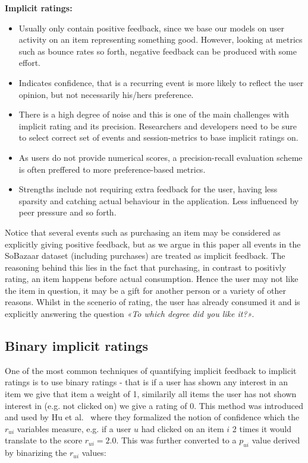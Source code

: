 \textbf{Implicit ratings:}
\begin{itemize}
\item Usually only contain positive feedback, since we base our models on user
activity on an item representing something good. However, looking at metrics
such as bounce rates so forth, negative feedback can be produced with some
effort.
\item Indicates confidence, that is a recurring event is more likely to reflect
the user opinion, but not necessarily his/hers preference.
\item There is a high degree of noise and this is one of the main challenges
with implicit rating and its precision. Researchers and developers need to be
sure to select correct set of events and session-metrics to base implicit
ratings on.
\item As users do not provide numerical scores, a precision-recall evaluation
scheme is often preffered to more preference-based metrics.
\item Strengths include not requiring extra feedback for the user, having less
sparsity and catching actual behaviour in the application. Less influenced by
peer pressure and so forth.
\end{itemize}

Notice that several events such as purchasing an item may be considered as
explicitly giving positive feedback, but as we argue in this paper all events
in the SoBazaar dataset (including purchases) are treated as implicit feedback.
The reasoning behind this lies in the fact that purchasing, in contrast to
positivly rating, an item happens before actual consumption. Hence the user may
not like the item in question, it may be a gift for another person or a variety
of other reasons. Whilst in the scenerio of rating, the user has already
consumed it and is explicitly answering the question \textit{«To which degree
did you like it?»}.

\clearpage
\subsection{Binary implicit ratings}
\label{implicit-als-wr}

One of the most common techniques of quantifying implicit feedback to implicit
ratings is to use binary ratings - that is if a user has shown any interest in
an item we give that item a weight of 1, similarily all items the user has not
shown interest in (e.g. not clicked on) we give a rating of 0. This method was
introduced and used by Hu et al.~\cite{Hu2008} where they formalized the
notion of confidence which the $r_{ui}$ variables measure, e.g. if a user $u$
had clicked on an item $i$ 2 times it would translate to the score $r_{ui} =
2.0$. This was further converted to a $p_{ui}$ value derived by binarizing the
$r_{ui}$ values:


